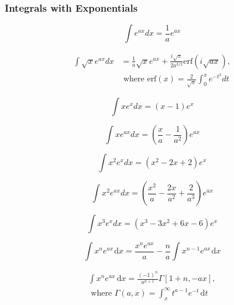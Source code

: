 \documentclass[11pt, letterpaper, notitlepage]{article}
\begin{document}
\begin{multicols}{2}
\begin{footnotesize}
 
\subsubsection{Integrals with Exponentials}

\begin{equation}
\int e^{ax} dx = \frac{1}{a}e^{ax} 
\end{equation}

\begin{align}
\int \sqrt{x} e^{ax} dx &= \frac{1}{a}\sqrt{x}e^{ax} 
+\frac{i\sqrt{\pi}}{2a^{3/2}}
\text{erf}\left(i\sqrt{ax}\right), \nonumber \\&
\text{ where erf}(x)=\frac{2}{\sqrt{\pi}}\int_0^x e^{-t^2}dt
\end{align}

\begin{equation}
\int x e^x dx = (x-1) e^x 
\end{equation}

\begin{equation}
\int x e^{ax} dx = \left(\frac{x}{a}-\frac{1}{a^2}\right) e^{ax} 
\end{equation}

\begin{equation}
\int x^2 e^{x} dx = \left(x^2 - 2x + 2\right) e^{x}
\end{equation}

\begin{equation}
\int x^2 e^{ax} dx = \left(\frac{x^2}{a}-\frac{2x}{a^2}+\frac{2}{a^3}\right) e^{ax} 
\end{equation}

\begin{equation}
\int x^3 e^{x} dx = \left(x^3-3x^2 + 6x - 6\right) e^{x} 
\end{equation}
 
\begin{equation}
\int x^n e^{ax}\hspace{1pt}\text{d}x = \dfrac{x^n e^{ax}}{a} - 
\dfrac{n}{a}\int x^{n-1}e^{ax}\hspace{1pt}\text{d}x
\end{equation} 
 
\begin{equation}
\begin{split}
\int x^n e^{ax}\hspace{2pt}\text{d}x = \frac{(-1)^n}{a^{n+1}}\Gamma[1+n,-ax], \\
 \text{ where } \Gamma(a,x)=\int_x^{\infty} t^{a-1}e^{-t}\hspace{2pt}\text{d}t
 \end{split}
 \end{equation}


\end{footnotesize}
\end{multicols}
\end{document}
